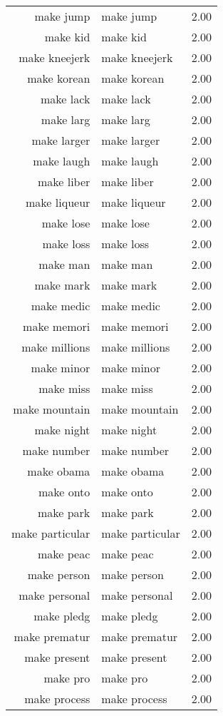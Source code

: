 \begin{table}[ht]
\begin{tabular}{rlr}
  make jump & make jump & 2.00 \\ 
  make kid & make kid & 2.00 \\ 
  make kneejerk & make kneejerk & 2.00 \\ 
  make korean & make korean & 2.00 \\ 
  make lack & make lack & 2.00 \\ 
  make larg & make larg & 2.00 \\ 
  make larger & make larger & 2.00 \\ 
  make laugh & make laugh & 2.00 \\ 
  make liber & make liber & 2.00 \\ 
  make liqueur & make liqueur & 2.00 \\ 
  make lose & make lose & 2.00 \\ 
  make loss & make loss & 2.00 \\ 
  make man & make man & 2.00 \\ 
  make mark & make mark & 2.00 \\ 
  make medic & make medic & 2.00 \\ 
  make memori & make memori & 2.00 \\ 
  make millions & make millions & 2.00 \\ 
  make minor & make minor & 2.00 \\ 
  make miss & make miss & 2.00 \\ 
  make mountain & make mountain & 2.00 \\ 
  make night & make night & 2.00 \\ 
  make number & make number & 2.00 \\ 
  make obama & make obama & 2.00 \\ 
  make onto & make onto & 2.00 \\ 
  make park & make park & 2.00 \\ 
  make particular & make particular & 2.00 \\ 
  make peac & make peac & 2.00 \\ 
  make person & make person & 2.00 \\ 
  make personal & make personal & 2.00 \\ 
  make pledg & make pledg & 2.00 \\ 
  make prematur & make prematur & 2.00 \\ 
  make present & make present & 2.00 \\ 
  make pro & make pro & 2.00 \\ 
  make process & make process & 2.00 \\ 

\end{tabular}
\end{table}
